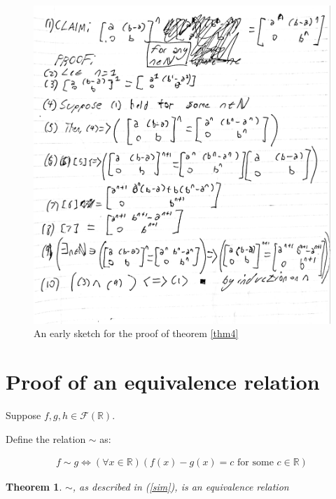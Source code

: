 \documentclass[12pt]{article}
\newcommand{\reals}{\mathbb{R}}
\newcommand{\freals}{\mathcal{F}(\reals)}
\newtheorem{thm}{Theorem}
\begin{document}
\begin{figure}
	\includegraphics[scale=0.17]{proof12.jpg}
	\caption{An early sketch for the proof of theorem \ref{thm4}}
	\centering
	\label{proof12}
\end{figure}

\section{Proof of an equivalence relation}

Suppose $f,g,h \in \freals$.

Define the relation $\sim$ as:

\begin{align} \label{sim}
	f \sim g \iff (\forall x \in \reals)(f(x) - g(x) = c \text{ for some } c \in \reals)
\end{align}

\begin{thm} \label{thm5}
	$\sim$, as described in (\ref{sim}), is an equivalence relation
\end{thm}
\end{document}
